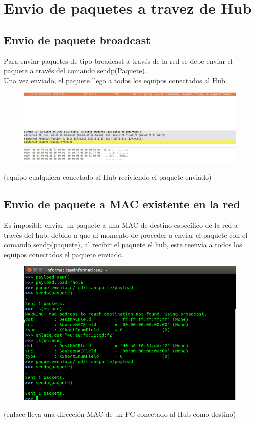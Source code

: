 \documentclass[spanish]{udpreport}
\begin{document}
\vspace{14cm}
\section{Envio de paquetes a travez de Hub}

\subsection{Envio de paquete broadcast}
Para enviar paquetes de tipo broadcast a través de la red se debe enviar el paquete a través del comando sendp(Paquete).  \\

Una vez enviado, el paquete llego a todos los equipos conectados al Hub
\begin{figure}[H]
\begin{center}
\includegraphics[scale=0.4]{images/Hub1.png}
\end{center}
\end{figure}
(equipo cualquiera conectado al Hub reciviendo el paquete enviado)
\vspace{14cm}
\subsection{Envio de paquete a MAC existente en la red}
Es imposible enviar un paquete a una MAC de destino específico de la red a través del hub, debido a que al momento de proceder a enviar el paquete con el comando sendp(paquete), al recibir el paquete el hub, este reenvía a todos los equipos conectados el paquete enviado.
\begin{figure}[H]
\begin{center}
\includegraphics[scale=0.7]{images/Hub2.png}
\end{center}
\end{figure}
(enlace lleva una dirección MAC de un PC conectado al Hub como destino)
\vspace{14cm}
\end{document}

